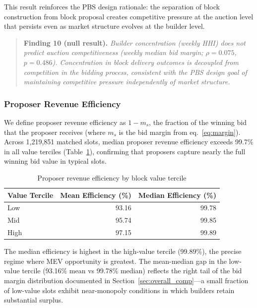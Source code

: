 \documentclass[11pt]{article}
\begin{document}
This result reinforces the PBS design rationale: the separation of block
construction from block proposal creates competitive pressure at the auction
level that persists even as market structure evolves at the builder level.

\begin{quote}
\textbf{Finding 10 (null result).} \textit{Builder concentration (weekly
HHI) does not predict auction competitiveness (weekly median bid margin;
$\rho = 0.075$, $p = 0.486$). Concentration in block delivery outcomes is
decoupled from competition in the bidding process, consistent with the PBS
design goal of maintaining competitive pressure independently of market
structure.}
\end{quote}

\subsubsection{Proposer Revenue Efficiency}
\label{sec:proposer_eff_sec}

We define proposer revenue efficiency as $1 - m_s$, the fraction of the
winning bid that the proposer receives (where $m_s$ is the bid margin from
eq.~\ref{eq:margin}). Across 1,219,851 matched slots, median proposer
revenue efficiency exceeds 99.7\% in all value terciles
(Table~\ref{tab:proposer_eff}), confirming that proposers capture nearly the
full winning bid value in typical slots.

\begin{table}[h]
\centering
\caption{Proposer revenue efficiency by block value tercile}
\label{tab:proposer_eff}
\begin{tabular}{lrr}
\toprule
Value Tercile & Mean Efficiency (\%) & Median Efficiency (\%) \\
\midrule
Low & 93.16 & 99.78 \\
Mid & 95.74 & 99.85 \\
High & 97.15 & 99.89 \\
\bottomrule
\end{tabular}
\end{table}

The median efficiency is highest in the high-value tercile (99.89\%), the
precise regime where MEV opportunity is greatest. The mean-median gap in the
low-value tercile (93.16\% mean vs 99.78\% median) reflects the right tail
of the bid margin distribution documented in
Section~\ref{sec:overall_comp}---a small fraction
of low-value slots exhibit near-monopoly conditions in which builders retain
substantial surplus.
\end{document}
